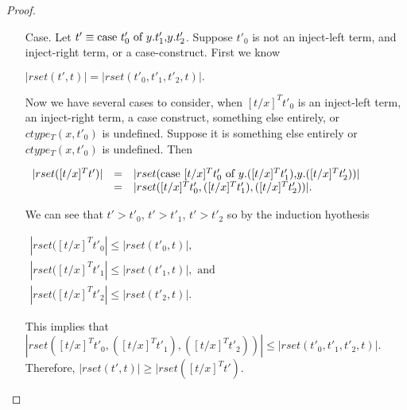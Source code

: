 \begin{proof}
\begin{itemize}
\item[Case.] 
  Let $t' \equiv \mbox{case}\ t'_0\ \text{of}\ y\text{.}t'_1\text{,}y\text{.}t'_2$.  Suppose $t'_0$ is not an inject-left term, and inject-right term,
  or a case-construct.  First we know 
  \begin{center}
    \begin{math}
      |rset(t', t)| = |rset(t'_0, t'_1, t'_2, t)|.
    \end{math}
  \end{center}
  Now we have several cases to consider, when $[t/x]^T t'_0$ is an inject-left term,
  an inject-right term, a case construct, something else entirely, or $ctype_T(x,t'_0)$ is undefined. Suppose it is something else entirely or
  $ctype_T(x,t'_0)$ is undefined.
  Then 
  \begin{center}
    \begin{math}
      \begin{array}{lll}
        |rset([t/x]^T t')| & = & |rset(\mbox{case}\ [t/x]^T t'_0\ \text{of}\ y\text{.}([t/x]^T t'_1)\text{,}y\text{.}([t/x]^T t'_2))|\\
        & = & |rset([t/x]^T t'_0,([t/x]^T t'_1),([t/x]^T t'_2))|.
      \end{array}
    \end{math}
  \end{center}
  We can see that $t' > t'_0$, $t' > t'_1$, $t' > t'_2$ so by the induction hyothesis
  \begin{center}
    \begin{math}
      \begin{array}{lll}
        |rset([t/x]^T t'_0| \leq |rset(t'_0, t)|,\\
        |rset([t/x]^T t'_1| \leq |rset(t'_1, t)|, \text{ and }\\
        |rset([t/x]^T t'_2| \leq |rset(t'_2, t)|.
      \end{array}
    \end{math}
  \end{center}
  This implies that $|rset([t/x]^T t'_0,([t/x]^T t'_1),([t/x]^T t'_2))| \leq |rset(t'_0,t'_1,t'_2,t)|$.\\
  Therefore, $|rset(t', t)| \geq |rset([t/x]^T t')$.
  

\end{itemize}
\end{proof}

